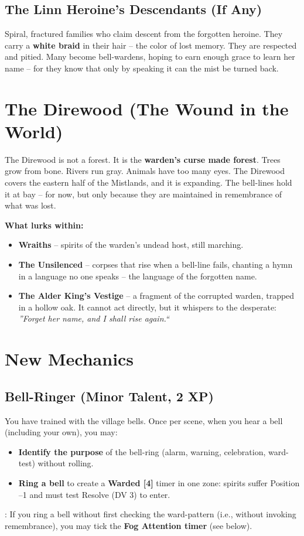 \documentclass[12pt]{article}
\begin{document}
\subsection{The Linn Heroine's Descendants (If Any)}
Spiral, fractured families who claim descent from the forgotten heroine. They carry a \textbf{white braid} in their hair -- the color of lost memory. They are respected and pitied. Many become bell-wardens, hoping to earn enough grace to learn her name -- for they know that only by speaking it can the mist be turned back.

\section{The Direwood (The Wound in the World)}
The Direwood is not a forest. It is the \textbf{warden's curse made forest}. Trees grow from bone. Rivers run gray. Animals have too many eyes. The Direwood covers the eastern half of the Mistlands, and it is expanding. The bell-lines hold it at bay -- for now, but only because they are maintained in remembrance of what was lost.

\textbf{What lurks within:}
\begin{itemize}[leftmargin=*]
  \item \textbf{Wraiths} -- spirits of the warden's undead host, still marching.
  \item \textbf{The Unsilenced} -- corpses that rise when a bell-line fails, chanting a hymn in a language no one speaks -- the language of the forgotten name.
  \item \textbf{The Alder King's Vestige} -- a fragment of the corrupted warden, trapped in a hollow oak. It cannot act directly, but it whispers to the desperate: \textit{''Forget her name, and I shall rise again.``}
\end{itemize}

\section{New Mechanics}

\subsection{Bell-Ringer (Minor Talent, 2 XP)}
You have trained with the village bells. Once per scene, when you hear a bell (including your own), you may:
\begin{itemize}[leftmargin=*]
  \item \textbf{Identify the purpose} of the bell-ring (alarm, warning, celebration, ward-test) without rolling.
  \item \textbf{Ring a bell} to create a \textbf{Warded [4]} timer in one zone: spirits suffer Position --1 and must test Resolve (DV 3) to enter.
\end{itemize}
\downside: If you ring a bell without first checking the ward-pattern (i.e., without invoking remembrance), you may tick the \textbf{Fog Attention timer} (see below).
\end{document}
